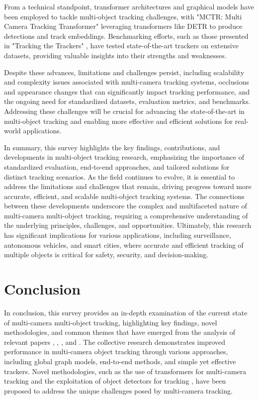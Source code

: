 \documentclass[conference]{IEEEtran}
\begin{document}
From a technical standpoint, transformer architectures and graphical models have been employed to tackle multi-object tracking challenges, with "MCTR: Multi Camera Tracking Transformer" \cite{MCTR: Multi Camera Tracking Transformer} leveraging transformers like DETR to produce detections and track embeddings. Benchmarking efforts, such as those presented in "Tracking the Trackers" \cite{Tracking the Trackers}, have tested state-of-the-art trackers on extensive datasets, providing valuable insights into their strengths and weaknesses.

Despite these advances, limitations and challenges persist, including scalability and complexity issues associated with multi-camera tracking systems, occlusions and appearance changes that can significantly impact tracking performance, and the ongoing need for standardized datasets, evaluation metrics, and benchmarks. Addressing these challenges will be crucial for advancing the state-of-the-art in multi-object tracking and enabling more effective and efficient solutions for real-world applications.

In summary, this survey highlights the key findings, contributions, and developments in multi-object tracking research, emphasizing the importance of standardized evaluation, end-to-end approaches, and tailored solutions for distinct tracking scenarios. As the field continues to evolve, it is essential to address the limitations and challenges that remain, driving progress toward more accurate, efficient, and scalable multi-object tracking systems. The connections between these developments underscore the complex and multifaceted nature of multi-camera multi-object tracking, requiring a comprehensive understanding of the underlying principles, challenges, and opportunities. Ultimately, this research has significant implications for various applications, including surveillance, autonomous vehicles, and smart cities, where accurate and efficient tracking of multiple objects is critical for safety, security, and decision-making.

\section{Conclusion}
In conclusion, this survey provides an in-depth examination of the current state of multi-camera multi-object tracking, highlighting key findings, novel methodologies, and common themes that have emerged from the analysis of relevant papers \cite{An equalised global graphical model-based approach}, \cite{MCTR: Multi Camera Tracking Transformer}, \cite{Tracking without bells and whistles}, and \cite{Tracktor}. The collective research demonstrates improved performance in multi-camera object tracking through various approaches, including global graph models, end-to-end methods, and simple yet effective trackers. Novel methodologies, such as the use of transformers for multi-camera tracking \cite{MCTR: Multi Camera Tracking Transformer} and the exploitation of object detectors for tracking \cite{Tracktor}, have been proposed to address the unique challenges posed by multi-camera tracking.
\end{document}
